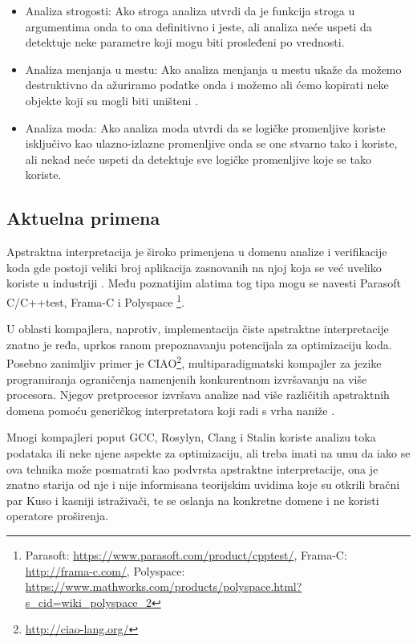 \begin{itemize}
\item Analiza strogosti:
Ako stroga analiza utvrdi da je funkcija stroga u argumentima onda to ona definitivno i jeste, ali analiza neće uspeti da detektuje neke parametre koji mogu biti prosleđeni po vrednosti. 

\item Analiza menjanja u mestu:
Ako analiza menjanja u mestu ukaže da možemo destruktivno da ažuriramo podatke onda i možemo ali ćemo kopirati neke objekte koji su mogli biti uništeni \cite{Girard1987}. 

\item Analiza moda:
Ako analiza moda utvrdi da se logičke promenljive koriste isključivo kao ulazno-izlazne promenljive onda se one stvarno tako i koriste, ali nekad neće uspeti da detektuje sve logičke promenljive koje se tako koriste. 

\end{itemize}

\subsection{Aktuelna primena}
Apstraktna interpretacija je široko primenjena u domenu analize i verifikacije koda gde postoji veliki broj aplikacija zasnovanih na njoj koja se već uveliko koriste u industriji \cite{Wilhelm-Wachter}. Među poznatijim alatima tog tipa mogu se navesti Parasoft C/C++test, Frama-C i Polyspace \footnote{Parasoft: \url{https://www.parasoft.com/product/cpptest/}, Frama-C: \url{http://frama-c.com/}, Polyspace: \url{https://www.mathworks.com/products/polyspace.html?s_cid=wiki_polyspace_2}}. 

U oblasti kompajlera, naprotiv, implementacija čiste apstraktne interpretacije znatno je ređa, uprkos ranom prepoznavanju potencijala za optimizaciju koda\cite{cousot}. 	Posebno zanimljiv primer je CIAO\footnote{\url{http://ciao-lang.org/}}, multiparadigmatski kompajler za jezike programiranja ograničenja namenjenih konkurentnom izvršavanju na više procesora. Njegov pretprocesor izvršava analize nad više različitih apstraktnih domena pomo\-ću generičkog interpretatora koji radi 	s vrha naniže \cite{ciao-report}. 

Mnogi kompajleri poput GCC, Rosylyn, Clang i Stalin koriste analizu toka podataka ili neke njene aspekte za optimizaciju, ali treba imati na umu da iako se ova tehnika može posmatrati kao podvrsta apstraktne interpretacije, ona je znatno starija od nje i nije informisana teorijskim uvidima koje su otkrili bračni par Kuso i kasniji istraživači, te se oslanja na konkretne domene i ne koristi operatore proširenja.




